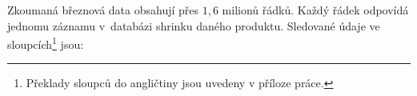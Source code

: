 
Zkoumaná březnová data obsahují přes $1{,6}$ milionů řádků.
Každý řádek odpovídá jednomu záznamu v~databázi shrinku daného produktu. Sledované údaje ve sloupcích\footnote{Překlady sloupců do angličtiny jsou uvedeny v příloze práce.} jsou: 
